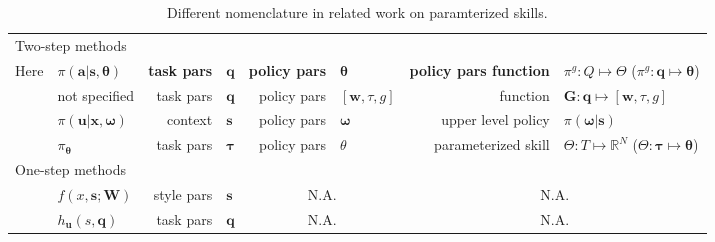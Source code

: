 \documentclass[12pt]{article}
\newcommand{\polg}   {\ensuremath{\pi^g}}
\newcommand{\pol}    {\ensuremath{\pi}}
\newcommand{\act}    {\ensuremath{\mathbf{a}}}
\newcommand{\sta}    {\ensuremath{\mathbf{s}}}
\newcommand{\appsp}  {\ensuremath{\Theta}}
\newcommand{\taskp}  {\ensuremath{\mathbf{q}}}
\newcommand{\app}    {\ensuremath{\bm{\theta}}}
\newcommand{\taskpsp}{\ensuremath{Q}}
\begin{document}
\begin{table}[ht]
  \centering
\begin{scriptsize}
\begin{tabular}{|l|l|rl|rl|rl|}
\hline
\multicolumn{8}{|l|}{Two-step methods}\\
Here                          
& $\pol(\act|\sta,\app)$ 
& {\bf task pars}            & \taskp 
& {\bf policy pars}          & \app 
& {\bf policy pars function} & $\polg: \taskpsp \mapsto \appsp$ ($\polg: \taskp \mapsto \app$)\\  
\cite{ude10taskspecific}      
& not specified
& task pars            & $\mathbf{q}$ 
& policy pars          & $[\mathbf{w},\tau,g]$ 
& function             & $\mathbf{G}: \mathbf{q} \mapsto [\mathbf{w},\tau,g]$ \\  
\cite{kupcsik13dataefficient} 
& $\pi(\mathbf{u}|\mathbf{x},\mathbf{\omega})$ 
& context              & $\mathbf{s}$
& policy pars          & $\mathbf{\omega}$ 
& upper level policy   & $\pi(\mathbf{\omega}|\mathbf{s})$ \\  
\cite{silva12learning}        
& $\pi_\mathbf{\theta}$
& task pars            & $\mathbf{\tau}$ 
& policy pars          & ${\theta}$
& parameterized skill  & $\Theta: T \mapsto \mathbb{R}^N$ ($\Theta: \mathbf{\tau} \mapsto \mathbf{\theta}$)\\
\hline
\multicolumn{8}{|l|}{One-step methods}\\
\cite{matsubara11learning}    
& $f(x,\mathbf{s}; \mathbf{W})$
& style pars           & $\mathbf{s}$ 
& \multicolumn{2}{c|}{N.A.}   
& \multicolumn{2}{c|}{N.A.} \\  
\cite{stulp13learning}        
& $h_\mathbf{u}(s,\mathbf{q})$
& task pars            & $\mathbf{q}$ 
& \multicolumn{2}{c|}{N.A.}   
& \multicolumn{2}{c|}{N.A.} \\  
\end{tabular}
\end{scriptsize}
  \caption{\label{tab_nomenclature} Different nomenclature in related work on paramterized skills.}
\end{table}
\end{document}
